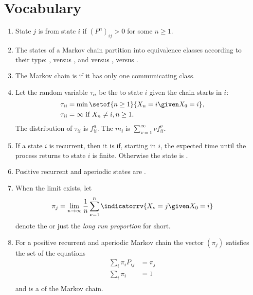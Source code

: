 \documentclass[12pt]{article}
\begin{document}
\section*{Vocabulary}
\begin{enumerate}
    \item
        State \( j \) is  from state \( i \) if \( (P^{n})_
        {ij} > 0 \) for some \( n \ge 1 \).
    \item
        The states of a Markov chain partition into equivalence classes
        according to their type:  , 
        versus , and  versus ,
         versus .
    \item
        The Markov chain is  if it has only one
        communicating class.
    \item
        Let the random variable \( \tau_{ii} \) be the 
        to state \( i \) given the chain starts in \( i \):
        \begin{align*}
            \tau_{ii} &= \min\setof{n \ge 1}{X_n = i \given X_0 = i}, \\
            \tau_{ii} &= \infty \text{ if } X_n \ne i, n \ge 1.
        \end{align*}
        The distribution of \( \tau_{ii} \) is \( f^n_{ii} \).  The
         \( m_i \) is \( \sum_ {\nu=1}^\infty
        \nu f^\nu_{ii} \).
    \item
        If a state \( i \) is recurrent, then it is  if, starting in \( i \), the expected time until the
        process returns to state \( i \) is finite.  Otherwise the state
        is .
    \item
        Positive recurrent and aperiodic states are .
    \item
        When the limit exists, let
        \[
            \pi_j = \lim_{n \to \infty} \frac{1}{n} \sum\limits_{\nu=1}^n
            \indicatorrv{X_{\nu}= j \given X_0 = i}
        \] denote the  or just the \emph{long run proportion} for
        short.
    \item
        For a positive recurrent and aperiodic Markov chain the vector \(
        (\pi_j) \) satisfies the set of the equations
        \begin{align*}
            \sum\limits_{i} \pi_{i} P_{ij} &= \pi_{j}\\
            \sum\limits_{i} \pi_{i} &= 1 \\
        \end{align*}
        and is a  of the
        Markov chain.
\end{enumerate}
\end{document}
